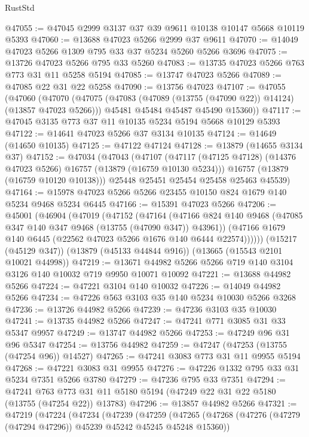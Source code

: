 \begin{lexlean}{RustStd}
\begin{coremodule}
@47055 := @47045 @2999 @3137 @37 @39 @9611 @10138 @10147 @5668 @10119 @5393
@47060 := @13688 @47023 @5266 @2999 @37 @9611
@47070 := @14049 @47023 @5266 @1309 @795 @33 @37 @5234 @5260 @5266 @3696
@47075 := @13726 @47023 @5266 @795 @33 @5260
@47083 := @13735 @47023 @5266 @763 @773 @31 @11 @5258 @5194
@47085 := @13747 @47023 @5266
@47089 := @47085 @22 @31 @22 @5258
@47090 := @13756 @47023
@47107 := @47055
    (@47060
      (@47070
        (@47075 (@47083 (@47089 (@13755 (@47090 @22)) @14124) (@13857 @47023 @5266)))
        @45481
        @45484
        @45487
        @45490
        @15360))
@47117 := @47045 @3135 @773 @37 @11 @10135 @5234 @5194 @5668 @10129 @5393
@47122 := @14641 @47023 @5266 @37 @3134 @10135
@47124 := @14649 (@14650 @10135)
@47125 := @47122 @47124
@47128 := @13879 (@14655 @3134 @37)
@47152 := @47034
    (@47043
      (@47107
        (@47117 (@47125 @47128) (@14376 @47023 @5266) @16757 (@13879 (@16759 @10130 @5234)))
        @16757
        (@13879 (@16759 @10120 @10138)))
      @25448
      @25451
      @25454
      @25458
      @25463
      @45539)
@47164 := @15978 @47023 @5266 @5266 @23455 @10150 @824 @1679 @140 @5234 @9468 @5234 @6445
@47166 := @15391 @47023 @5266
@47206 := @45001
    (@46904
      (@47019
        (@47152
          (@47164
            (@47166 @824 @140 @9468 (@47085 @347 @140 @347 @9468 (@13755 (@47090 @347)) @43961))
            (@47166 @1679 @140 @6445 (@22562 @47023 @5266 @1676 @140 @6444 @22574))))))
    (@15217 (@45129 @347))
    (@13879 (@45133 @44844 @916))
    (@13665 (@15543 @2101 @10021 @44998))
@47219 := @13671 @44982 @5266 @5266 @719 @140 @3104 @3126 @140 @10032 @719 @9950 @10071 @10092
@47221 := @13688 @44982 @5266
@47224 := @47221 @3104 @140 @10032
@47226 := @14049 @44982 @5266
@47234 := @47226 @563 @3103 @35 @140 @5234 @10030 @5266 @3268
@47236 := @13726 @44982 @5266
@47239 := @47236 @3103 @35 @10030
@47241 := @13735 @44982 @5266
@47247 := @47241 @771 @3085 @31 @33 @5347 @9957
@47249 := @13747 @44982 @5266
@47253 := @47249 @96 @31 @96 @5347
@47254 := @13756 @44982
@47259 := @47247 (@47253 (@13755 (@47254 @96)) @14527)
@47265 := @47241 @3083 @773 @31 @11 @9955 @5194
@47268 := @47221 @3083 @31 @9955
@47276 := @47226 @1332 @795 @33 @31 @5234 @7351 @5266 @3780
@47279 := @47236 @795 @33 @7351
@47294 := @47241
    @763
    @773
    @31
    @11
    @5180
    @5194
    (@47249 @22 @31 @22 @5180 (@13755 (@47254 @22)) @13783)
@47296 := @13857 @44982 @5266
@47321 := @47219
    (@47224
      (@47234
        (@47239
          (@47259
            (@47265
              (@47268 (@47276 (@47279 (@47294 @47296)) @45239 @45242 @45245 @45248 @15360))

\end{coremodule}
\end{lexlean}
